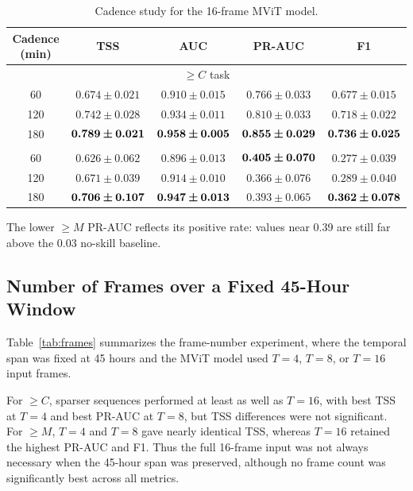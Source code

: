 \documentclass[runningheads]{llncs}
\begin{document}
\begin{table}[H]
\caption{Cadence study for the 16-frame MViT model.}
\centering
\label{tab:video}
\scriptsize
\setlength{\tabcolsep}{4pt}
\begin{tabular}{@{}ccccc@{}}
\toprule
Cadence (min) & TSS & AUC & PR-AUC & F1 \\
\midrule
\multicolumn{5}{c}{$\geq C$ task} \\
\midrule
60  & $0.674 \pm 0.021$ & $0.910 \pm 0.015$ & $0.766 \pm 0.033$ & $0.677 \pm 0.015$ \\
120 & $0.742 \pm 0.028$ & $0.934 \pm 0.011$ & $0.810 \pm 0.033$ & $0.718 \pm 0.022$ \\
180 & $\bm{0.789 \pm 0.021}$ & $\bm{0.958 \pm 0.005}$ & $\bm{0.855 \pm 0.029}$ & $\bm{0.736 \pm 0.025}$ \\
\addlinespace
\multicolumn{5}{c}{$\geq M$ task} \\
\midrule
60  & $0.626 \pm 0.062$ & $0.896 \pm 0.013$ & $\bm{0.405 \pm 0.070}$ & $0.277 \pm 0.039$ \\
120 & $0.671 \pm 0.039$ & $0.914 \pm 0.010$ & $0.366 \pm 0.076$ & $0.289 \pm 0.040$ \\
180 & $\bm{0.706 \pm 0.107}$ & $\bm{0.947 \pm 0.013}$ & $0.393 \pm 0.065$ & $\bm{0.362 \pm 0.078}$ \\
\bottomrule
\end{tabular}
\end{table}

The lower $\geq M$ PR-AUC reflects its positive rate: values near 0.39 are still far above the 0.03 no-skill baseline.

\subsection{Number of Frames over a Fixed 45-Hour Window}

Table~\ref{tab:frames} summarizes the frame-number experiment, where the temporal span was fixed at 45 hours and the MViT model used $T=4$, $T=8$, or $T=16$ input frames. 


For $\geq C$, sparser sequences performed at least as well as $T=16$, with best TSS at $T=4$ and best PR-AUC at $T=8$, but TSS differences were not significant. For $\geq M$, $T=4$ and $T=8$ gave nearly identical TSS, whereas $T=16$ retained the highest PR-AUC and F1. Thus the full 16-frame input was not always necessary when the 45-hour span was preserved, although no frame count was significantly best across all metrics.
\end{document}
